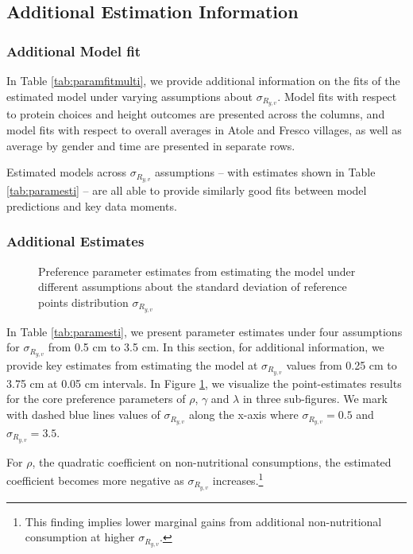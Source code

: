 \subsection{Additional Estimation Information \label{sec:estimorer}}

\subsubsection{Additional Model fit}


In Table \ref{tab:paramfitmulti}, we provide additional information on the fits of the estimated model under varying assumptions about $\sigma_{R_{y,v}}$. Model fits with respect to protein choices and height outcomes are presented across the columns, and model fits with respect to overall averages in Atole and Fresco villages, as well as average by gender and time are presented in separate rows.

Estimated models across $\sigma_{R_{y,v}}$ assumptions -- with estimates shown in Table \ref{tab:paramesti} -- are all able to provide similarly good fits between model predictions and key data moments.

\subsubsection{Additional Estimates}

\begin{figure}[htbp]
\caption{Preference parameter estimates from estimating the model under different assumptions about the standard deviation of reference points distribution $\sigma_{R_{y,v}}$}
\label{fig:estimatesmulti}
\end{figure}

In Table \ref{tab:paramesti}, we present parameter estimates under four assumptions for $\sigma_{R_{y,v}}$ from 0.5 cm to 3.5 cm. In this section, for additional information, we provide key estimates from estimating the model at $\sigma_{R_{y,v}}$ values from 0.25 cm to 3.75 cm at 0.05 cm intervals. In Figure \ref{fig:estimatesmulti}, we visualize the point-estimates results for the core preference parameters of $\rho$, $\gamma$ and $\lambda$ in three sub-figures. We mark with dashed blue lines values of $\sigma_{R_{y,v}}$ along the x-axis where $\sigma_{R_{y,v}}=0.5$ and $\sigma_{R_{y,v}}=3.5$.

For $\rho$, the quadratic coefficient on non-nutritional consumptions, the estimated coefficient becomes more negative as $\sigma_{R_{y,v}}$ increases.\footnote{This finding implies lower marginal gains from additional non-nutritional consumption at higher $\sigma_{R_{y,v}}$.}